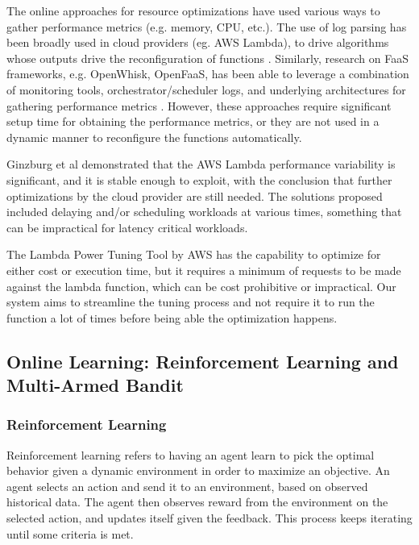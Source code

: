 \documentclass[conference]{IEEEtran}
\begin{document}
The online approaches for resource optimizations have used various ways to gather performance metrics (e.g. memory, CPU, etc.). The use of log parsing has been broadly used in cloud providers (eg. AWS Lambda), to drive algorithms whose outputs drive the reconfiguration of functions \cite{10063937, 9860980}. Similarly, research on FaaS frameworks, e.g. OpenWhisk, OpenFaaS, has been able to leverage a combination of monitoring tools, orchestrator/scheduler logs, and underlying architectures for gathering performance metrics \cite{9582234, 10.1145/3472883.3486992, 9946331}. However, these approaches require significant setup time for obtaining the performance metrics, or they are not used in a dynamic manner to reconfigure the functions automatically.

Ginzburg et al \cite{10.1145/3429880.3430099} demonstrated that the AWS Lambda performance variability is significant, and it is stable enough to exploit, with the conclusion that further optimizations by the cloud provider are still needed. The solutions proposed included delaying and/or scheduling workloads at various times, something that can be impractical for latency critical workloads.

The Lambda Power Tuning Tool by AWS \cite{aws_lambda_power_tuning} has the capability to optimize for either cost or execution time, but it requires a minimum of requests to be made against the lambda function, which can be cost prohibitive or impractical. Our system aims to streamline the tuning process and not require it to run the function a lot of times before being able the optimization happens.

\subsection{Online Learning: Reinforcement Learning and Multi-Armed Bandit}
\subsubsection{Reinforcement Learning}

Reinforcement learning refers to having an agent learn to pick the optimal behavior given a dynamic environment in order to maximize an objective. An agent selects an action and send it to an environment, based on observed historical data. The agent then observes reward from the environment on the selected action, and updates itself given the feedback. This process keeps iterating until some criteria is met. 
\end{document}
